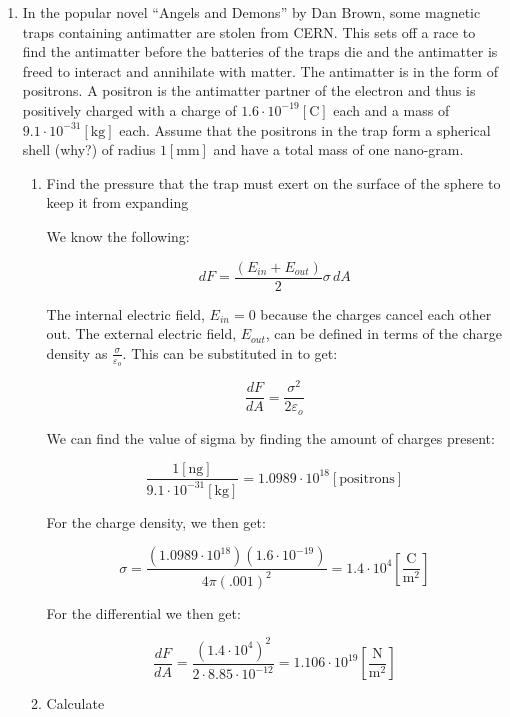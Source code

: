 \begin{enumerate}

  \item In the popular novel ``Angels and Demons'' by Dan Brown, some magnetic traps containing antimatter are stolen from CERN. This sets off a race to find the antimatter before the batteries of the traps die and the antimatter is freed to interact and annihilate with matter. The antimatter is in the form of positrons. A positron is the antimatter partner of the electron and thus is positively charged with a charge of $1.6\cdot10^{-19}[\si{\coulomb}]$ each and a mass of $9.1\cdot10^{-31}[\si{\kilo\gram}]$ each. Assume that the positrons in the trap form a spherical shell (why?) of radius $1[\si{\milli\meter}]$ and have a total mass of one nano-gram.

    \begin{enumerate}

      \item Find the pressure that the trap must exert on the surface of the sphere to keep it from expanding

        We know the following:

        $$dF=\frac{(E_{in}+E_{out})}{2}\sigma\,dA$$

        The internal electric field, $E_{in}=0$ because the charges cancel each other out. The external electric field, $E_{out}$, can be defined in terms of the charge density as $\frac{\sigma}{\varepsilon_o}$. This can be substituted in to get:

        $$\frac{dF}{dA}=\frac{\sigma^2}{2\varepsilon_o}$$

        We can find the value of sigma by finding the amount of charges present:

        $$\frac{1[\si{\nano\gram}]}{9.1\cdot10^{-31}[\si{\kilo\gram}]}=1.0989\cdot10^{18}[\text{positrons}]$$

        For the charge density, we then get:

        $$\sigma=\frac{\left(1.0989\cdot10^{18}\right)\left( 1.6\cdot10^{-19} \right)}{4\pi(.001)^2}=1.4\cdot10^{4}\left[ \frac{\si{\coulomb}}{\si{\meter\squared}} \right]$$

        For the differential we then get:

        $$\boxed{\frac{dF}{dA}=\frac{(1.4\cdot10^4)^2}{2\cdot8.85\cdot10^{-12}}=1.106\cdot10^{19}\left[ \frac{\si{\newton}}{\si{\meter\squared}} \right]}$$

      \item Calculate 


\end{enumerate}
\end{enumerate}
